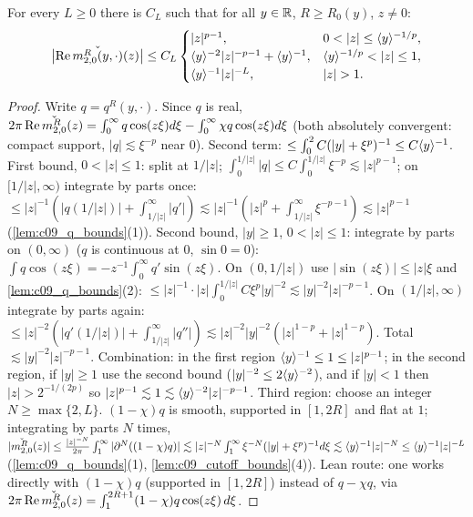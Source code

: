 \begin{lemma}
  \label{lem:c09_m20_kernel}
  For every $L\ge0$ there is $C_L$ such that for all $y\in\R$, $R\ge R_0(y)$, $z\neq0$:
  \[
    \bigl|\operatorname{Re}\widecheck{m_{2,0}^R(y,\cdot)}(z)\bigr|\le C_L\begin{cases}|z|^{p-1},&0<|z|\le\ang{y}^{-1/p},\\ \ang{y}^{-2}|z|^{-p-1}+\ang{y}^{-1},&\ang{y}^{-1/p}<|z|\le1,\\ \ang y^{-1}|z|^{-L},&|z|>1.\end{cases}
  \]
\end{lemma}
\begin{proof}
  Write $q=q^R(y,\cdot)$. Since $q$ is real, $2\pi\operatorname{Re}\widecheck{m^R_{2,0}}(z)=\int_0^\infty q\cos(z\xi)d\xi-\int_0^\infty\chi q\cos(z\xi)d\xi$ (both absolutely convergent: compact
  support, $|q|\lesssim\xi^{-p}$ near $0$). Second term: $\le\int_0^2C(|y|+\xi^p)^{-1}\le C\ang{y}^{-1}$.
  First bound, $0<|z|\le1$: split at $1/|z|$; $\int_0^{1/|z|}|q|\le C\int_0^{1/|z|}\xi^{-p}\lesssim|z|^{p-1}$; on $[1/|z|,\infty)$ integrate by parts once:
  $\le|z|^{-1}(|q(1/|z|)|+\int_{1/|z|}^\infty|q'|)\lesssim|z|^{-1}(|z|^{p}+\int_{1/|z|}^\infty\xi^{-p-1})\lesssim|z|^{p-1}$ (\cref{lem:c09_q_bounds}(1)).
  Second bound, $|y|\ge1$, $0<|z|\le1$: integrate by parts on $(0,\infty)$ ($q$ is continuous at $0$, $\sin0=0$): $\int q\cos(z\xi)=-z^{-1}\int_0^\infty q'\sin(z\xi)$.
  On $(0,1/|z|)$ use $|\sin(z\xi)|\le|z|\xi$ and \cref{lem:c09_q_bounds}(2): $\le|z|^{-1}\cdot|z|\int_0^{1/|z|}C\xi^p|y|^{-2}\lesssim|y|^{-2}|z|^{-p-1}$. On $(1/|z|,\infty)$
  integrate by parts again: $\le|z|^{-2}(|q'(1/|z|)|+\int_{1/|z|}^\infty|q''|)\lesssim|z|^{-2}|y|^{-2}(|z|^{1-p}+|z|^{1-p})$. Total $\lesssim|y|^{-2}|z|^{-p-1}$.
  Combination: in the first region $\ang y^{-1}\le1\le|z|^{p-1}$; in the second region, if $|y|\ge1$ use the second bound ($|y|^{-2}\le2\ang y^{-2}$), and if $|y|<1$
  then $|z|>2^{-1/(2p)}$ so $|z|^{p-1}\lesssim1\lesssim\ang{y}^{-2}|z|^{-p-1}$.
  Third region: choose an integer $N\ge\max\{2,L\}$. $(1-\chi)q$ is smooth, supported in $[1,2R]$ and flat at $1$; integrating by parts $N$ times,
  $|\widecheck{m^R_{2,0}}(z)|\le\frac{|z|^{-N}}{2\pi}\int_1^\infty|\partial^N((1-\chi)q)|\lesssim|z|^{-N}\int_1^\infty\xi^{-N}(|y|+\xi^p)^{-1}d\xi\lesssim\ang{y}^{-1}|z|^{-N}\le\ang{y}^{-1}|z|^{-L}$
  (\cref{lem:c09_q_bounds}(1), \cref{lem:c09_cutoff_bounds}(4)).
  Lean route: one works directly with $(1-\chi)q$ (supported in $[1,2R]$) instead of $q-\chi q$, via $2\pi\operatorname{Re}\widecheck{m^R_{2,0}}(z)=\int_1^{2R+1}(1-\chi)q\cos(z\xi)\,d\xi$.
\end{proof}


